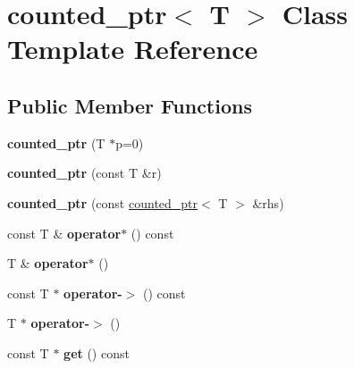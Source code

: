 \hypertarget{classcounted__ptr}{
\section{counted\_\-ptr$<$ T $>$ Class Template Reference}
\label{classcounted__ptr}
}
\subsection*{Public Member Functions}
\begin{DoxyCompactItemize}
\item 
\hypertarget{classcounted__ptr_aa290dbadac3873d8f193ac7a484ada24}{
{\bfseries counted\_\-ptr} (T $\ast$p=0)}
\label{classcounted__ptr_aa290dbadac3873d8f193ac7a484ada24}

\item 
\hypertarget{classcounted__ptr_ad5de505f03ec61d48408023e81ca0a2c}{
{\bfseries counted\_\-ptr} (const T \&r)}
\label{classcounted__ptr_ad5de505f03ec61d48408023e81ca0a2c}

\item 
\hypertarget{classcounted__ptr_addd6a26d75df27b597575d866994099c}{
{\bfseries counted\_\-ptr} (const \hyperlink{classcounted__ptr}{counted\_\-ptr}$<$ T $>$ \&rhs)}
\label{classcounted__ptr_addd6a26d75df27b597575d866994099c}

\item 
\hypertarget{classcounted__ptr_ad1a74545c3827c54ce7000fa62465b37}{
const T \& {\bfseries operator$\ast$} () const }
\label{classcounted__ptr_ad1a74545c3827c54ce7000fa62465b37}

\item 
\hypertarget{classcounted__ptr_aaf76392f6b0fd5010644fe3d4cac1fd6}{
T \& {\bfseries operator$\ast$} ()}
\label{classcounted__ptr_aaf76392f6b0fd5010644fe3d4cac1fd6}

\item 
\hypertarget{classcounted__ptr_a7749e5e20e93a3301307c1a1185017cb}{
const T $\ast$ {\bfseries operator-\/$>$} () const }
\label{classcounted__ptr_a7749e5e20e93a3301307c1a1185017cb}

\item 
\hypertarget{classcounted__ptr_a11cc57380df68abd9f191076612e771d}{
T $\ast$ {\bfseries operator-\/$>$} ()}
\label{classcounted__ptr_a11cc57380df68abd9f191076612e771d}

\item 
\hypertarget{classcounted__ptr_a3faa3268ed130e02bc5cefbde8cd1f47}{
const T $\ast$ {\bfseries get} () const }
\label{classcounted__ptr_a3faa3268ed130e02bc5cefbde8cd1f47}


\end{DoxyCompactItemize}
